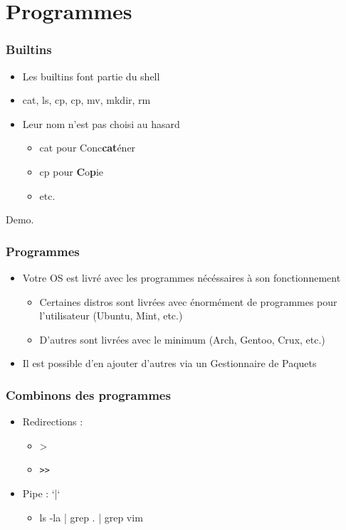 \section{Programmes}
\begin{frame}
    \frametitle{Builtins}
    \begin{itemize}
	\item Les builtins font partie du shell
	\item cat, ls, cp, cp, mv, mkdir, rm
	\item Leur nom n'est pas choisi au hasard
	\begin{itemize}
        \item cat pour Conc\textbf{cat}éner
	    \item cp pour \textbf{C}o\textbf{p}ie
	    \item etc.
	\end{itemize}
    \end{itemize}
\end{frame}

\begin{frame}
        Demo.
\end{frame}

\begin{frame}
    \frametitle{Programmes}
    \begin{itemize}
	\item Votre OS est livré avec les programmes nécéssaires à son fonctionnement
    \begin{itemize}
        \item Certaines distros sont livrées avec énormément de programmes pour
                l'utilisateur (Ubuntu, Mint, etc.)
        \item D'autres sont livrées avec le minimum (Arch, Gentoo, Crux, etc.)
    \end{itemize}
	\item Il est possible d'en ajouter d'autres via un Gestionnaire de Paquets
    \end{itemize}
\end{frame}

\begin{frame}[fragile]
    \frametitle{Combinons des programmes}
    \begin{itemize}
	\item Redirections :
	\begin{itemize}
	    \item >
        \item \begin{verbatim}>>\end{verbatim}
	\end{itemize}
	\item Pipe : `|`
	\begin{itemize}
	    \item ls -la | grep . | grep vim
	\end{itemize}
    \end{itemize}
\end{frame}

